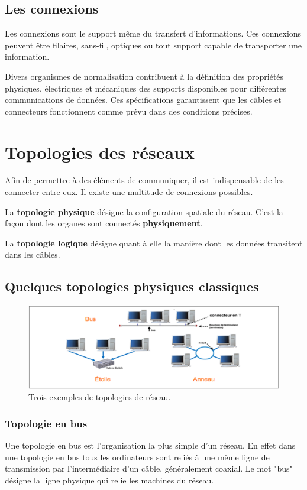 \documentclass[10pt,fleqn]{article} %
\begin{document}
\subsection{Les connexions}
\begin{defi}
  Les connexions sont le support même du transfert d'informations. Ces connexions peuvent être filaires, sans-fil, optiques ou tout support capable de transporter une information.
\end{defi}
Divers organismes de normalisation contribuent à la définition des propriétés physiques, électriques et mécaniques des supports disponibles pour différentes communications de données.
Ces spécifications garantissent que les câbles et connecteurs fonctionnent comme prévu dans des conditions précises.


\section{Topologies des réseaux}
Afin de permettre à des éléments de communiquer, il est indispensable de les connecter entre eux. Il existe une multitude de connexions possibles.
\begin{defi}
  La \textbf{topologie physique} désigne la configuration spatiale du réseau. C'est la façon dont les organes sont connectés \textbf{physiquement}.
\end{defi}
\begin{defi}
  La \textbf{topologie logique} désigne quant à elle la manière dont les données transitent dans les câbles.
\end{defi}

\subsection{Quelques topologies physiques classiques}
\begin{figure}[h]
  \centering
  \includegraphics[width=.7\textwidth]{img/reseau_topologies}
  \caption{Trois exemples de topologies de réseau.}
  \label{fig:res_topo}
\end{figure}
\subsubsection{Topologie en bus}
Une topologie en bus est l'organisation la plus simple d'un réseau. En effet dans une topologie en bus tous les ordinateurs sont reliés à une même ligne de transmission par l'intermédiaire d'un câble, généralement coaxial. Le mot "bus" désigne la ligne physique qui relie les machines du réseau.
\end{document}
